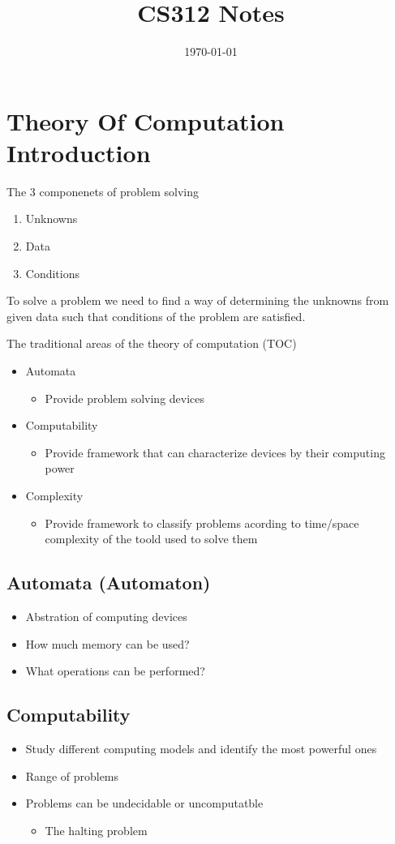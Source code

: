 \documentclass[11pt]{article}
\date{\today}
\title{CS312 Notes}
\begin{document}
\maketitle
\tableofcontents

\section{Theory Of Computation Introduction}
\label{sec:org0ac23a1}
The 3 componenets of problem solving
\begin{enumerate}
\item Unknowns
\item Data
\item Conditions
\end{enumerate}

To solve a problem we need to find a way of determining the unknowns from given data such that conditions of the problem are satisfied.

The traditional areas of the theory of computation (TOC)
\begin{itemize}
\item Automata
\begin{itemize}
\item Provide problem solving devices
\end{itemize}
\item Computability
\begin{itemize}
\item Provide framework that can characterize devices by their computing power
\end{itemize}
\item Complexity
\begin{itemize}
\item Provide framework to classify problems acording to time/space complexity of the toold used to solve them
\end{itemize}
\end{itemize}
\subsection{Automata (Automaton)}
\label{sec:org191f283}
\begin{itemize}
\item Abstration of computing devices
\item How much memory can be used?
\item What operations can be performed?
\end{itemize}
\subsection{Computability}
\label{sec:orgf4ef912}
\begin{itemize}
\item Study different computing models and identify the most powerful ones
\item Range of problems
\item Problems can be undecidable or uncomputatble
\begin{itemize}
\item The halting problem
\end{itemize}
\end{itemize}
\end{document}
